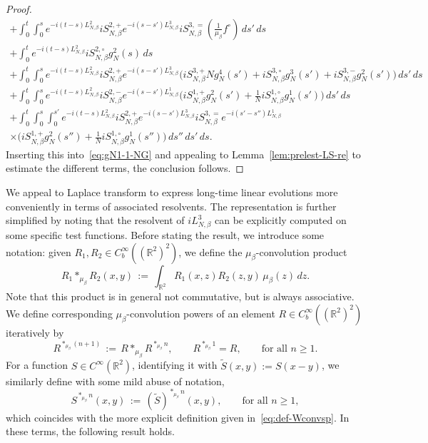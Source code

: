 \documentclass[a4paper,11pt,reqno,noindent]{amsart}
\theoremstyle{plain}
\numberwithin{equation}{section}
\newcommand{\R}{\mathbb R}
\newcommand{\3}{|\!|\!|}
\begin{document}
\begin{proof}
\begin{multline*}
+\int_0^t\int_0^se^{-i(t-s)L_{N,\beta}^2}iS_{N,\beta}^{2,+}e^{-i(s-s')L_{N,\beta}^3}iS_{N,\beta}^{3,=}(\tfrac1{\mu_\beta}f^\circ)\,ds'\,ds\\
+\int_0^te^{-i(t-s)L_{N,\beta}^2}iS_{N,\beta}^{2,\circ}g_N^{2}(s)\,ds\\
+\int_0^t\int_0^se^{-i(t-s)L_{N,\beta}^2}iS_{N,\beta}^{2,+}e^{-i(s-s')L_{N,\beta}^3}\Big(iS_{N,\beta}^{3,+}Ng_N^{4}(s')+iS_{N,\beta}^{3,\circ}g_N^{3}(s')+iS_{N,\beta}^{3,-}g_N^{2}(s')\Big)\,ds'\,ds\\
+\int_0^t\int_0^se^{-i(t-s)L_{N,\beta}^2} iS_{N,\beta}^{2,-}e^{-i(s-s')L_{N,\beta}^1}\Big(iS_{N,\beta}^{1,+}g_N^{2}(s')+\tfrac1NiS_{N,\beta}^{1,\circ}g_N^{1}(s')\Big)\,ds'\,ds\\
+\int_0^t\int_0^s\int_0^{s'}e^{-i(t-s)L_{N,\beta}^2}iS_{N,\beta}^{2,+}e^{-i(s-s')L_{N,\beta}^3}iS_{N,\beta}^{3,=}e^{-i(s'-s'')L_{N,\beta}^1}\\
\times\Big(iS_{N,\beta}^{1,+}g_N^{2}(s'')+\tfrac1NiS_{N,\beta}^{1,\circ}g_N^{1}(s'')\Big)\,ds''\,ds'\,ds.
\end{multline*}
\endgroup
Inserting this into~\eqref{eq:gN1-1-NG} and appealing to Lemma~\ref{lem:prelest-LS-re} to estimate the different terms, the conclusion follows.
\end{proof}

We appeal to Laplace transform to express long-time linear evolutions more conveniently in terms of associated resolvents. The representation is further simplified by noting that the resolvent of $iL_{N,\beta}^3$ can be explicitly computed on some specific test functions.
Before stating the result, we introduce some notation:
given $R_1,R_2\in C^\infty_b((\R^2)^2)$, we define the $\mu_\beta$-convolution product
\[R_1\ast_{\mu_\beta}R_2(x,y)\,:=\,\int_{\R^2}R_1(x,z)R_2(z,y)\,\mu_\beta(z)\,dz.\]
Note that this product is in general not commutative, but is always associative. We define corresponding $\mu_\beta$-convolution powers of an element $R\in C^\infty_b((\R^2)^2)$ iteratively by
\[R^{\ast_{\mu_\beta}(n+1)}\,:=\,R\ast_{\mu_\beta}R^{\ast_{\mu_\beta}n},\qquad R^{\ast_{\mu_\beta}1}=R,\qquad \text{for all $n\ge1$}.\]
For a function $S\in C^\infty(\R^2)$, identifying it with $\tilde S(x,y):=S(x-y)$, we similarly define with some mild abuse of notation,
\[S^{\ast_{\mu_\beta}n}(x,y)\,:=\,(\tilde S)^{\ast_{\mu_\beta}n}(x,y),\qquad \text{for all $n\ge1$},\]
which coincides with the more explicit definition given in~\eqref{eq:def-Wconvsp}.
In these terms, the following result holds.
\end{document}
